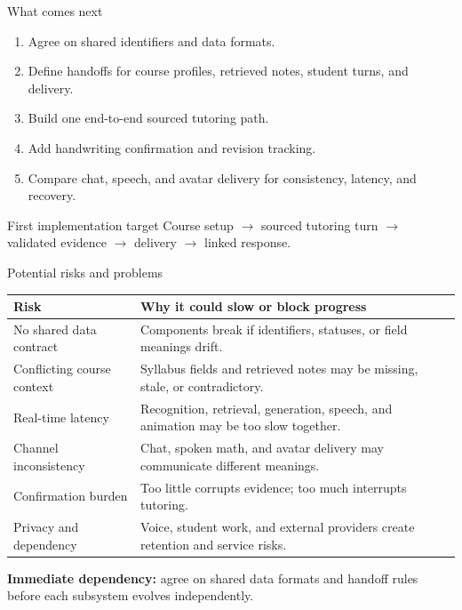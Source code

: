 \documentclass[aspectratio=169,10pt]{beamer}
\newcommand{\risk}[1]{\textcolor{Rust}{\textbf{#1}}}
\begin{document}
\begin{frame}{What comes next}
\begin{enumerate}
\item Agree on shared identifiers and data formats.
\item Define handoffs for course profiles, retrieved notes, student turns, and delivery.
\item Build one end-to-end sourced tutoring path.
\item Add handwriting confirmation and revision tracking.
\item Compare chat, speech, and avatar delivery for consistency, latency, and recovery.
\end{enumerate}
\vspace{.55em}
\begin{block}{First implementation target}
Course setup $\rightarrow$ sourced tutoring turn $\rightarrow$ validated evidence $\rightarrow$ delivery $\rightarrow$ linked response.
\end{block}
\end{frame}

\begin{frame}{Potential risks and problems}
\small
\begin{tabularx}{\textwidth}{@{}p{}X@{}}
\toprule
\textbf{Risk} & \textbf{Why it could slow or block progress} \\
\midrule
No shared data contract & Components break if identifiers, statuses, or field meanings drift. \\
Conflicting course context & Syllabus fields and retrieved notes may be missing, stale, or contradictory. \\
Real-time latency & Recognition, retrieval, generation, speech, and animation may be too slow together. \\
Channel inconsistency & Chat, spoken math, and avatar delivery may communicate different meanings. \\
Confirmation burden & Too little corrupts evidence; too much interrupts tutoring. \\
Privacy and dependency & Voice, student work, and external providers create retention and service risks. \\
\bottomrule
\end{tabularx}
\vspace{.4em}
\centering
\risk{Immediate dependency:} agree on shared data formats and handoff rules before each subsystem evolves independently.
\end{frame}
\end{document}
